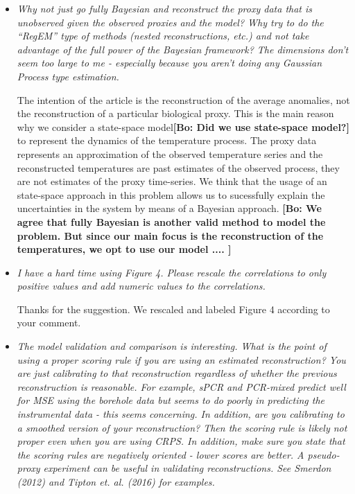 \documentclass[11pt]{article}
\newcommand{\lb}[1]{\color{ForestGreen}\textbf{[Luis B.: #1]}\normalcolor}
\newcommand{\bl}[1]{\color{red}\textbf{[Bo: #1]}\normalcolor}
\begin{document}
\begin{itemize}
\lb{I'm trying an unscreened version of the proxy dataset in order to answer
  this question.}
\bl{Thanks for trying this. Let's see what the results would tell. Intuitively, I feel this might be worse, as some data that are screened out are really noisy so including them may just deterioriate the resonstruction.}

\item \textit{Why not just go fully Bayesian and reconstruct the proxy data that
    is unobserved given the observed proxies and the model? Why try to do the
    ``RegEM'' type of methods (nested reconstructions, etc.) and not take
    advantage of the full power of the Bayesian framework? The dimensions don't
    seem too large to me - especially because you aren't doing any Gaussian
    Process type estimation.
}

The intention of the article is the reconstruction of the average anomalies,
not the reconstruction of a particular biological proxy. This is the main reason
why we consider a state-space model\bl{Did we use state-space model?} to represent the dynamics of the temperature
process. The proxy data represents an approximation of the observed temperature
series and the reconstructed temperatures are past estimates of the observed
process, they are not estimates of the proxy time-series. We think that the
usage of an state-space approach in this problem allows us to sucessfully
explain the uncertainties in the system by means of a Bayesian approach. 
\bl{We agree that fully Bayesian is another valid method to model the problem. But since our main focus is the reconstruction of the temperatures, we opt to use our model ....  }



\item \textit{I have a hard time using Figure 4. Please rescale the correlations
    to only positive values and add numeric values to the correlations.}

  Thanks for the suggestion. We rescaled and labeled Figure 4 according to your comment.

  
\item \textit{The model validation and comparison is interesting. What is the
    point of using a proper scoring rule if you are using an estimated reconstruction? You are just calibrating to that reconstruction regardless of
whether the previous reconstruction is reasonable. For example, sPCR and
PCR-mixed predict well for MSE using the borehole data but seems to do poorly in
predicting the instrumental data - this seems concerning. In addition, are you
calibrating to a smoothed version of your reconstruction? Then the scoring rule
is likely not proper even when you are using CRPS. In addition, make sure you
state that the scoring rules are negatively oriented - lower scores are better.
A pseudo-proxy experiment can be useful in validating reconstructions. See Smerdon (2012) and Tipton et. al. (2016) for examples.
}


\end{itemize}
\end{document}
